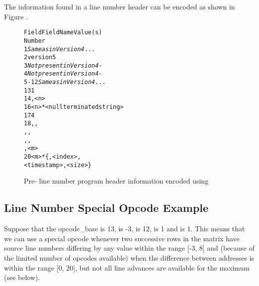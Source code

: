 The information found in a \DWARFVersionIV{} line number 
header can be encoded as shown in 
Figure .

\begin{figure}[h]
\begin{dwflisting}
\begin{alltt}
  Field           Field Name                      Value(s)
  Number
     1    \textit{Same as in Version 4}            ...
     2    version                         5
     3    \textit{Not present in Version 4}        -
     4    \textit{Not present in Version 4}        -
   5-12   \textit{Same as in Version 4}            ...
    13    \HFNdirectoryentryformatcount{}    1
    14    \HFNdirectoryentryformat{}          \DWLNCTpath,     \HFNdirectoriescount{}               <n>
    16    \HFNdirectories{}                     <n>*<null terminated string>
    17    \HFNfilenameentryformatcount{}    4
    18    \HFNfilenameentryformat{}          \DWLNCTpath, \DWFORMstring,
                                          \DWLNCTdirectoryindex, \DWFORMudata,
                                          \DWLNCTtimestamp, \DWFORMudata,
                                          \DWLNCTsize,     \HFNfilenamescount{}                <m>
    20    \HFNfilenames{}                      <m>*\{<null terminated string>, <index>, 
                                               <timestamp>, <size>\}
\end{alltt}
\end{dwflisting}
\begin{centering}
\caption{Pre-\DWARFVersionV{} line number program header information \mbox{encoded} using \DWARFVersionV}
\label{fig:preV5LNCTusingV5}
\end{centering}
\end{figure}

\subsection{Line Number Special Opcode Example}
\label{app:linenumberspecialopcodeexample}
Suppose that the opcode\_base is 13, 
 is -3, 
 is 12, 
 is 1
and 
 is 1. 
This means that
we can use a special opcode whenever two successive rows in
the matrix have source line numbers differing by any value
within the range [-3, 8] and (because of the limited number
of opcodes available) when the difference between addresses
is within the range [0, 20], but not all line advances are
available for the maximum  (see below).

